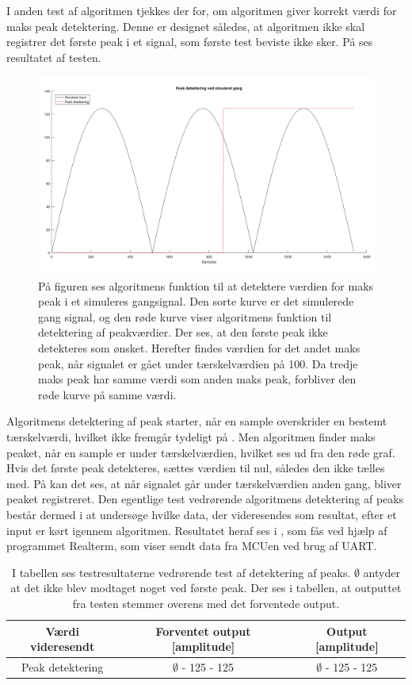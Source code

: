 I anden test af algoritmen tjekkes der for, om algoritmen giver korrekt værdi for maks peak detektering. Denne er designet således, at algoritmen ikke skal registrer det første peak i et signal, som første test beviste ikke sker. På  ses resultatet af testen.
\begin{figure}[H]
	\centering
	\includegraphics[scale=0.3]{figures/cDesign/test_peak_gang.png}
	\caption{På figuren ses algoritmens funktion til at detektere værdien for maks peak i et simuleres gangsignal. Den sorte kurve er det simulerede gang signal, og den røde kurve viser algoritmens funktion til detektering af peakværdier. Der ses, at den første peak ikke detekteres som ønsket. Herefter findes værdien for det andet maks peak, når signalet er gået under tærskelværdien på 100. Da tredje maks peak har samme værdi som anden maks peak, forbliver den røde kurve på samme værdi.}
	\label{fig:test_peak_gang}
\end{figure}
Algoritmens detektering af peak starter, når en sample overskrider en bestemt tærskelværdi, hvilket ikke fremgår tydeligt på . Men algoritmen finder maks peaket, når en sample er under tærskelværdien, hvilket ses ud fra den røde graf. Hvis det første peak detekteres, sættes værdien til nul, således den ikke tælles med. På  kan det ses, at når signalet går under tærskelværdien anden gang, bliver peaket registreret. Den egentlige test vedrørende algoritmens detektering af peaks består dermed i at undersøge hvilke data, der videresendes som resultat, efter et input er kørt igennem algoritmen. Resultatet heraf ses i , som fås ved hjælp af programmet Realterm, som viser sendt data fra MCUen ved brug af UART.
\begin{table}[H]
	\centering
	\begin{tabular}{ccc}
		\hline
		\rowcolor[HTML]{C0C0C0} 
		Værdi videresendt & Forventet output [amplitude] & Output [amplitude] \\ \hline
		Peak detektering & $\emptyset$ - 125 - 125 & $\emptyset$ - 125 - 125 \\ \hline
	\end{tabular}
	\caption{I tabellen ses testresultaterne vedrørende test af detektering af peaks. $\emptyset$ antyder at det ikke blev modtaget noget ved første peak. Der ses i tabellen, at outputtet fra testen stemmer overens med det forventede output.}
	\label{tab:test_res_peak}
\end{table}\vspace{-0.5cm}
